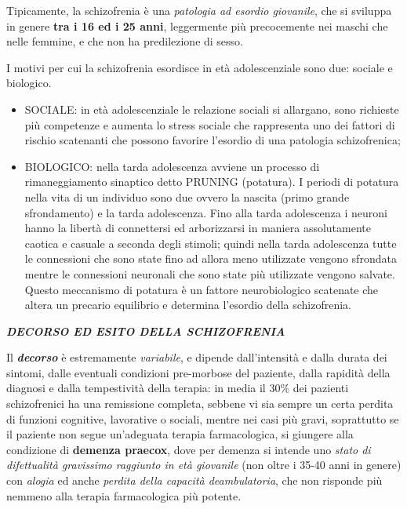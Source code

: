 \documentclass[]{article}
\begin{document}
Tipicamente, la schizofrenia è una \emph{patologia ad esordio
giovanile}, che si sviluppa in genere \textbf{tra i 16 ed i 25 anni},
leggermente più precocemente nei maschi che nelle femmine, e che non ha
predilezione di sesso.

I motivi per cui la schizofrenia esordisce in età adolescenziale sono
due: sociale e biologico.

\begin{itemize}
\item
  SOCIALE: in età adolescenziale le relazione sociali si allargano, sono
  richieste più competenze e aumenta lo stress sociale che rappresenta
  uno dei fattori di rischio scatenanti che possono favorire l'esordio
  di una patologia schizofrenica;
\item
  BIOLOGICO: nella tarda adolescenza avviene un processo di
  rimaneggiamento sinaptico detto PRUNING (potatura). I periodi di
  potatura nella vita di un individuo sono due ovvero la nascita (primo
  grande sfrondamento) e la tarda adolescenza. Fino alla tarda
  adolescenza i neuroni hanno la libertà di connettersi ed arborizzarsi
  in maniera assolutamente caotica e casuale a seconda degli stimoli;
  quindi nella tarda adolescenza tutte le connessioni che sono state
  fino ad allora meno utilizzate vengono sfrondata mentre le connessioni
  neuronali che sono state più utilizzate vengono salvate. Questo
  meccanismo di potatura è un fattore neurobiologico scatenate che
  altera un precario equilibrio e determina l'esordio della
  schizofrenia.
\end{itemize}

\textbf{\emph{DECORSO ED ESITO DELLA SCHIZOFRENIA}}

Il \textbf{\emph{decorso}} è estremamente \emph{variabile}, e dipende
dall'intensità e dalla durata dei sintomi, dalle eventuali condizioni
pre-morbose del paziente, dalla rapidità della diagnosi e dalla
tempestività della terapia: in media il 30\% dei pazienti schizofrenici
ha una remissione completa, sebbene vi sia sempre un certa perdita di
funzioni cognitive, lavorative o sociali, mentre nei casi più gravi,
soprattutto se il paziente non segue un'adeguata terapia farmacologica,
si giungere alla condizione di \textbf{demenza praecox}, dove per
demenza si intende uno \emph{stato di difettualità gravissimo raggiunto
in età giovanile} (non oltre i 35-40 anni in genere) con \emph{alogia}
ed anche \emph{perdita della capacità deambulatoria}, che non risponde
più nemmeno alla terapia farmacologica più potente.
\end{document}
